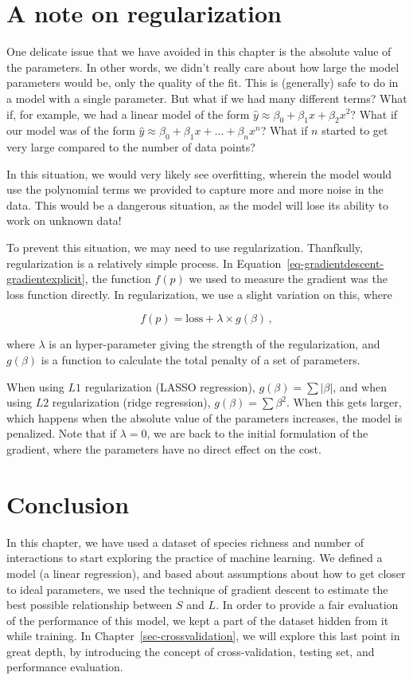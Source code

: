 \documentclass[
  letterpaper,
]{scrbook}
\begin{document}
\section{A note on regularization}\label{a-note-on-regularization}

One delicate issue that we have avoided in this chapter is the absolute
value of the parameters. In other words, we didn't really care about how
large the model parameters would be, only the quality of the fit. This
is (generally) safe to do in a model with a single parameter. But what
if we had many different terms? What if, for example, we had a linear
model of the form \(\hat y \approx \beta_0 + \beta_1 x + \beta_2 x^2\)?
What if our model was of the form
\(\hat y \approx \beta_0 + \beta_1 x + \dots + \beta_n x^n\)? What if
\(n\) started to get very large compared to the number of data points?

In this situation, we would very likely see overfitting, wherein the
model would use the polynomial terms we provided to capture more and
more noise in the data. This would be a dangerous situation, as the
model will lose its ability to work on unknown data!

To prevent this situation, we may need to use regularization.
Thanfkully, regularization is a relatively simple process. In
Equation~\ref{eq-gradientdescent-gradientexplicit}, the function
\(f(p)\) we used to measure the gradient was the loss function directly.
In regularization, we use a slight variation on this, where

\[
f(p) = \text{loss} + \lambda \times g(\beta) \,,
\]

where \(\lambda\) is an hyper-parameter giving the strength of the
regularization, and \(g(\beta)\) is a function to calculate the total
penalty of a set of parameters.

When using \(L1\) regularization (LASSO regression),
\(g(\beta) = \sum |\beta|\), and when using \(L2\) regularization (ridge
regression), \(g(\beta) = \sum \beta^2\). When this gets larger, which
happens when the absolute value of the parameters increases, the model
is penalized. Note that if \(\lambda = 0\), we are back to the initial
formulation of the gradient, where the parameters have no direct effect
on the cost.

\section{Conclusion}\label{conclusion-1}

In this chapter, we have used a dataset of species richness and number
of interactions to start exploring the practice of machine learning. We
defined a model (a linear regression), and based about assumptions about
how to get closer to ideal parameters, we used the technique of gradient
descent to estimate the best possible relationship between \(S\) and
\(L\). In order to provide a fair evaluation of the performance of this
model, we kept a part of the dataset hidden from it while training. In
Chapter~\ref{sec-crossvalidation}, we will explore this last point in
great depth, by introducing the concept of cross-validation, testing
set, and performance evaluation.
\end{document}
